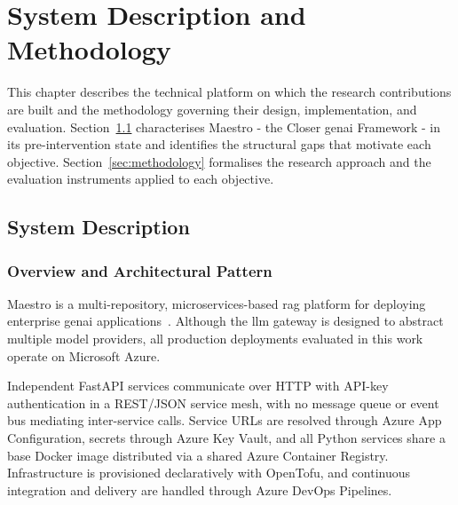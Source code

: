 
%
\chapter{System Description and Methodology}
\label{cha:system-description}

This chapter describes the technical platform on which the research
contributions are built and the methodology governing their design,
implementation, and evaluation.
Section~\ref{sec:system-description} characterises Maestro - the Closer
\gls{genai} Framework - in its pre-intervention state and identifies the structural
gaps that motivate each objective. Section~\ref{sec:methodology} formalises the
research approach and the evaluation instruments applied to each objective.

\section{System Description}
\label{sec:system-description}

\subsection{Overview and Architectural Pattern}
\label{subsec:overview}

Maestro is a multi-repository, microservices-based
\gls{rag} platform for deploying enterprise \gls{genai} applications~\cite{closer2025maestro}.
Although the \gls{llm} gateway is designed to abstract multiple model providers,
all production deployments evaluated in this work operate on Microsoft Azure.

Independent FastAPI services communicate over HTTP with API-key authentication
in a REST/JSON service mesh, with no message queue or event bus mediating
inter-service calls.
Service URLs are resolved through Azure App Configuration, secrets through
Azure Key Vault, and all Python services share a base Docker image distributed
via a shared Azure Container Registry.
Infrastructure is provisioned declaratively with OpenTofu, and continuous
integration and delivery are handled through Azure DevOps Pipelines.

